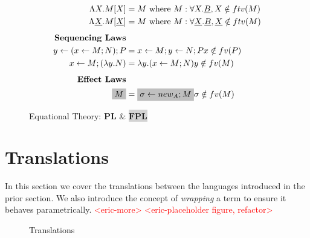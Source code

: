 \documentclass[acmsmall]{acmart}
\newcommand{\den}[1]{\llbracket #1\rrbracket}
\newcommand{\eric}[1]{\textcolor{red}{ <eric-#1> }}
\newcommand{\pl}{$\mathbf{PL}$}
\newcommand{\fpl}{$\mathbf{FPL}$}
\begin{document}
\begin{figure}[H]
\begin{minipage}[t]{0.48\textwidth}
\[\begin{aligned}
      \Lambda X. M[X] &= M  \text{ where } M : \forall X. \underline{B}, X \notin ftv(M)\\
      \Lambda \underline{X}. M[\underline{X}] &= M  \text{ where } M : \forall \underline{X}. \underline{B}, \underline{X} \notin ftv(M)\\[1ex]
      \textbf{Sequencing Laws}& \\
      y \leftarrow (x \leftarrow M;N); P &= x \leftarrow M; y \leftarrow N; P  x \notin fv(P)\\
      x \leftarrow M; (\lambda y . N) &= \lambda y. (x\leftarrow M; N)  y\notin fv(M)\\[1ex]
      \textbf{Effect Laws}& \\
      \colorbox{lightgray}{$M$} &= \colorbox{lightgray}{$\sigma \leftarrow new_A; M$}  \sigma \notin fv(M)
    \end{aligned}
    \]
  \end{minipage}
  \caption{Equational Theory: \pl \; \& \colorbox{lightgray}{\fpl}}
  \label{fig:EquationalTheory}
\end{figure}




    

\section{Translations}
In this section we cover the translations between the languages introduced in the prior section. We also introduce the concept of \textit{wrapping} a term to ensure it behaves parametrically.\eric{more}
\eric{placeholder figure, refactor}
\begin{figure}[H]
  \centering
  \caption{Translations}
  \label{fig:translations}
\end{figure}
\end{document}

